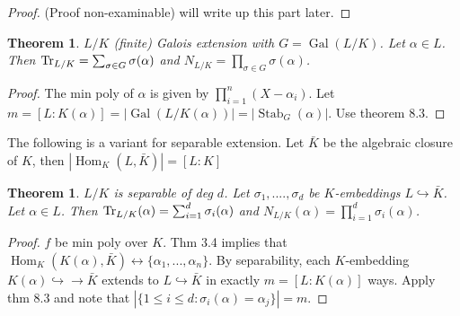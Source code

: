\documentclass{article}
\theoremstyle{definition}
\theoremstyle{remark}
\theoremstyle{plain}
\newtheorem{thm}[defn]{Theorem}
\newcommand{\Hom}{\operatorname{Hom}}
\newcommand{\Gal}{\operatorname{Gal}}
\begin{document}
\begin{proof}
    (Proof non-examinable) will write up this part later.
\end{proof}
\begin{thm}
    $L/K$ (finite) Galois extension with $G=\Gal(L/K)$. Let $\alpha\in L$. Then $\operatorname{Tr}_{L/K}=\sum_{\sigma\in G}\sigma(\alpha)$ and $N_{L/K}=\prod_{\sigma\in G}\sigma(\alpha)$.
\end{thm}
\begin{proof}
    The min poly of $\alpha$ is given by $\prod_{i=1}^n(X-\alpha_i)$. Let $m=[L:K(\alpha)]=|\Gal(L/K(\alpha))|=|\operatorname{Stab}_G(\alpha)|$. Use theorem 8.3.
\end{proof}
The following is a variant for separable extension. Let $\bar K$ be the algebraic closure of $K$, then $|\Hom_K(L,\bar K)|=[L:K]$
\begin{thm}
    $L/K$ is separable of deg $d$. Let $\sigma_1,....,\sigma_d$ be $K$-embeddings $L\hookrightarrow \bar K$. Let $\alpha\in L$. Then $\operatorname{Tr}_{L/K}(\alpha)=\sum_{i=1}^d\sigma_i(\alpha)$ and $N_{L/K}(\alpha)=\prod_{i=1}^d\sigma_i(\alpha)$.
\end{thm}
\begin{proof}
    $f$ be min poly over $K$. Thm 3.4 implies that $\Hom_K(K(\alpha),\bar K)\leftrightarrow\{\alpha_1,...,\alpha_n\}$.
    By separability, each $K$-embedding $K(\alpha)\hookrightarrow\to\bar K$ extends to $L\hookrightarrow\bar K$ in exactly $m=[L:K(\alpha)]$ ways. Apply thm 8.3 and note that $|\{1\le i\le d:\sigma_i(\alpha)=\alpha_j\}|=m$.
\end{proof}
\end{document}
